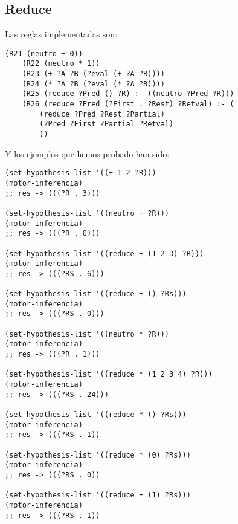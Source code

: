 \documentclass[nochap]{apuntes}
\begin{document}
\subsection*{Reduce}
Las reglas implementadas son:\\
\begin{lstlisting}[frame=single]
(R21 (neutro + 0))
	(R22 (neutro * 1))
	(R23 (+ ?A ?B (?eval (+ ?A ?B))))
	(R24 (* ?A ?B (?eval (* ?A ?B))))
	(R25 (reduce ?Pred () ?R) :- ((neutro ?Pred ?R)))
	(R26 (reduce ?Pred (?First . ?Rest) ?Retval) :- (
		(reduce ?Pred ?Rest ?Partial)
		(?Pred ?First ?Partial ?Retval)
		))
\end{lstlisting}
Y los ejemplos que hemos probado han sido:\\


\begin{lstlisting}[frame=single]
(set-hypothesis-list '((+ 1 2 ?R)))
(motor-inferencia)
;; res -> (((?R . 3)))

(set-hypothesis-list '((neutro + ?R)))
(motor-inferencia)
;; res -> (((?R . 0)))

(set-hypothesis-list '((reduce + (1 2 3) ?R)))
(motor-inferencia)
;; res -> (((?RS . 6)))

(set-hypothesis-list '((reduce + () ?Rs)))
(motor-inferencia)
;; res -> (((?RS . 0)))

(set-hypothesis-list '((neutro * ?R)))
(motor-inferencia)
;; res -> (((?R . 1)))

(set-hypothesis-list '((reduce * (1 2 3 4) ?R)))
(motor-inferencia)
;; res -> (((?RS . 24)))

(set-hypothesis-list '((reduce * () ?Rs)))
(motor-inferencia)
;; res -> (((?RS . 1))

(set-hypothesis-list '((reduce * (0) ?Rs)))
(motor-inferencia)
;; res -> (((?RS . 0))

(set-hypothesis-list '((reduce + (1) ?Rs)))
(motor-inferencia)
;; res -> (((?RS . 1))
\end{lstlisting}
\end{document}
